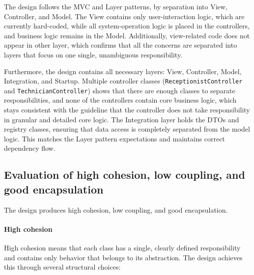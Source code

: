 \documentclass[a4paper]{scrartcl}
\begin{document}
The design follows the MVC and Layer patterns, by separation into View, Controller, and Model. The View contains only user-interaction logic, which are currently hard-coded, while all system-operation logic is placed in the controllers, and business logic remains in the Model. Additionally, view-related code does not appear in other layer, which confirms that all the concerns are separated into layers that focus on one single, unambiguous responsibility.

Furthermore, the design contains all necessary layers: View, Controller, Model, Integration, and Startup. Multiple controller classes (\texttt{ReceptionistController} and \texttt{TechnicianController}) shows that there are enough classes to separate responsibilities, and none of the controllers contain core business logic, which stays consistent with the guideline that the controller does not take responsibility in granular and detailed core logic.
The Integration layer holds the DTOs and registry classes, ensuring that data access is completely separated from the model logic. This matches the Layer pattern expectations and maintains correct dependency flow.

\subsection{Evaluation of high cohesion, low coupling, and good encapsulation}

The design produces high cohesion, low coupling, and good encapsulation.

\paragraph{High cohesion}
High cohesion means that each class has a single, clearly defined responsibility and contains only behavior that belongs to its abstraction. The design achieves this through several structural choices:
\end{document}
